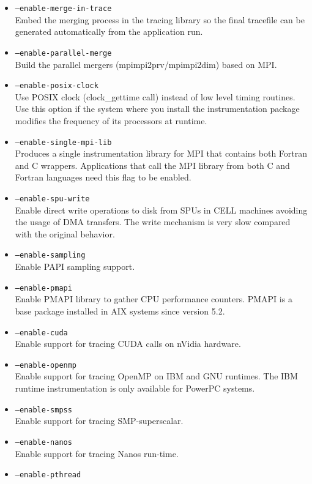 \begin{itemize}
	\item {\tt --enable-merge-in-trace} \\
	Embed the merging process in the tracing library so the final tracefile can be generated automatically from the application run.
	\item {\tt --enable-parallel-merge} \\
	Build the parallel mergers (mpimpi2prv/mpimpi2dim) based on MPI.
	\item {\tt --enable-posix-clock} \\
	Use POSIX clock (clock\_gettime call) instead of low level timing routines. Use this option if the system where you install the instrumentation package modifies the frequency of its processors at runtime.
	\item {\tt --enable-single-mpi-lib} \\
	Produces a single instrumentation library for MPI that contains both Fortran and C wrappers. Applications that call the MPI library from both C and Fortran languages need this flag to be enabled.
	\item {\tt --enable-spu-write} \\
	Enable direct write operations to disk from SPUs in CELL machines avoiding the usage of DMA transfers. The write mechanism is very slow compared with the original behavior.
	\item {\tt --enable-sampling} \\
	Enable PAPI sampling support.
	\item {\tt --enable-pmapi} \\
	Enable PMAPI library to gather CPU performance counters. PMAPI is a base package installed in AIX systems since version 5.2.
	\item {\tt --enable-cuda} \\
	Enable support for tracing CUDA calls on nVidia hardware.
	\item {\tt --enable-openmp} \\
	Enable support for tracing OpenMP on IBM and GNU runtimes. The IBM runtime instrumentation is only available for PowerPC systems.
	\item {\tt --enable-smpss} \\
	Enable support for tracing SMP-superscalar.
	\item {\tt --enable-nanos} \\
	Enable support for tracing Nanos run-time.
	\item {\tt --enable-pthread} \\

\end{itemize}

